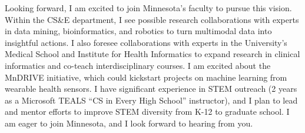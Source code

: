 \documentclass[11pt,letterpaper,roman]{moderncv}        %
\begin{document}
Looking forward, I am excited to join Minnesota's faculty to pursue this vision.
Within the CS\&E department,
I see possible research collaborations with experts in data mining, bioinformatics, and robotics
to turn multimodal data into insightful actions.
I also foresee collaborations with experts in the University's Medical School and Institute for Health Informatics to expand research in clinical informatics and co-teach interdisciplinary courses.
I am excited about the MnDRIVE initiative, which could kickstart projects on machine learning from wearable health sensors. I have significant experience in STEM outreach (2 years as a Microsoft TEALS ``CS in Every High School'' instructor), and I plan to lead and mentor efforts to improve STEM diversity from K-12 to graduate school.
I am eager to join Minnesota, and I look forward to hearing from you.

\makeletterclosing
\end{document}
